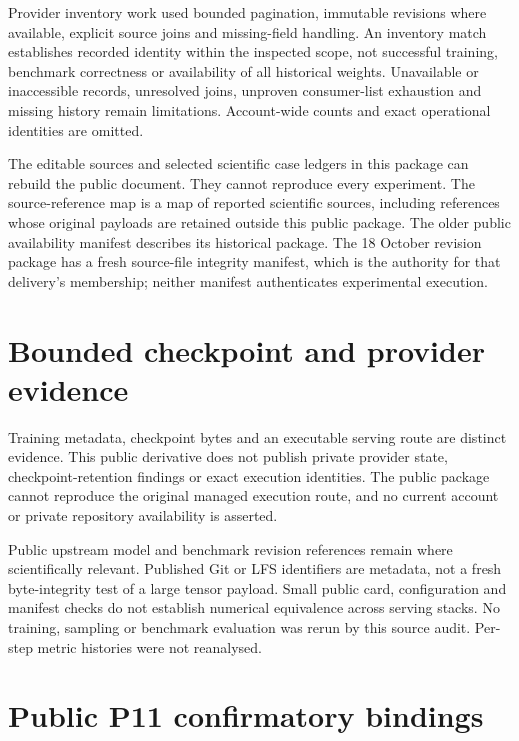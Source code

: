 \documentclass[12pt,a4paper]{report}
\begin{document}
Provider inventory work used bounded pagination, immutable revisions
where available, explicit source joins and missing-field handling. An
inventory match establishes recorded identity within the inspected
scope, not successful training, benchmark correctness or availability of
all historical weights. Unavailable or inaccessible records, unresolved
joins, unproven consumer-list exhaustion and missing history remain
limitations. Account-wide counts and exact operational identities are
omitted.

The editable sources and selected scientific case ledgers in this
package can rebuild the public document. They cannot reproduce every
experiment. The source-reference map is a map of reported scientific
sources, including references whose original payloads are retained
outside this public package. The older public availability manifest
describes its historical package. The 18 October revision package has a
fresh source-file integrity manifest, which is the authority for that
delivery's membership; neither manifest authenticates experimental
execution.

\section{Bounded checkpoint and provider
evidence}\label{bounded-checkpoint-and-provider-evidence}

Training metadata, checkpoint bytes and an executable serving route are
distinct evidence. This public derivative does not publish private
provider state, checkpoint-retention findings or exact execution
identities. The public package cannot reproduce the original managed
execution route, and no current account or private repository
availability is asserted.

Public upstream model and benchmark revision references remain where
scientifically relevant. Published Git or LFS identifiers are metadata,
not a fresh byte-integrity test of a large tensor payload. Small public
card, configuration and manifest checks do not establish numerical
equivalence across serving stacks. No training, sampling or benchmark
evaluation was rerun by this source audit. Per-step metric histories
were not reanalysed.

\section{Public P11 confirmatory
bindings}\label{public-p11-confirmatory-bindings}
\end{document}
